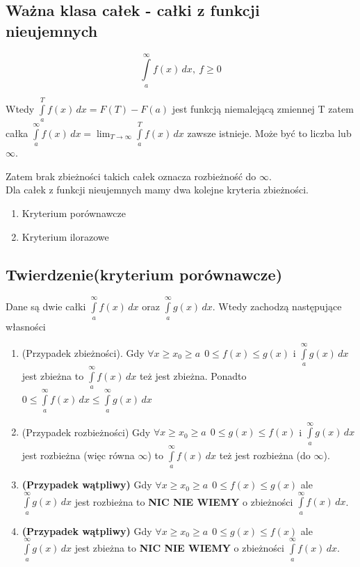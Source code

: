 \subsection*{Ważna klasa całek - całki z funkcji nieujemnych}

$$ \int\limits_{a}^{\infty} f(x) \,dx, \ f \geq 0 $$

Wtedy $ \int\limits_{a}^{T} f(x) \, dx = F(T) - F(a) $ jest funkcją niemalejącą zmiennej T zatem całka
$ \int\limits_{a}^{\infty} f(x) \, dx = \lim_{T \to \infty} \int\limits_{a}^{T} f(x) \,dx $
zawsze istnieje. Może być to liczba lub $\infty$.

Zatem brak zbieżności takich całek oznacza rozbieżność do $\infty$. \\

Dla całek z funkcji nieujemnych mamy dwa kolejne kryteria zbieżności.

\begin{enumerate}
    \item Kryterium porównawcze
    \item Kryterium ilorazowe
\end{enumerate}


\subsection{Twierdzenie(kryterium porównawcze)}

Dane są dwie całki $ \int\limits_{a}^{\infty} f(x) \,dx $ oraz
$ \int\limits_{a}^{\infty} g(x) \, dx $. Wtedy zachodzą następujące własności

\begin{enumerate}
    \item (Przypadek zbieżności). Gdy $ \forall x \geq x_0 \geq a \ \ 0 \leq f(x) \leq g(x) $ i $ \int\limits_{a}^{\infty} g(x) \,dx $
    jest zbieżna to $ \int\limits_{a}^{\infty} f(x) \,dx $ też jest zbieżna. Ponadto \
    $ 0 \leq \int\limits_{a}^{\infty} f(x) \,dx \leq \int\limits_{a}^{\infty} g(x) \,dx $
    
    \item (Przypadek rozbieżności) Gdy $ \forall x \geq x_0 \geq a \ \ 0 \leq g(x) \leq f(x) $ i $ \int\limits_{a}^{\infty} g(x) \,dx $
    jest rozbieżna (więc równa $\infty$) to $ \int\limits_{a}^{\infty} f(x) \,dx $ też jest rozbieżna (do $\infty$).
    
    \item \textbf{(Przypadek wątpliwy)} Gdy $ \forall x \geq x_0 \geq a \ \ 0 \leq f(x) \leq g(x) $ ale $ \int\limits_{a}^{\infty} g(x) \,dx $
    jest rozbieżna to \textbf{NIC NIE WIEMY} o zbieżności $ \int\limits_{a}^{\infty} f(x) \,dx $.
    
    \item \textbf{(Przypadek wątpliwy)} Gdy $ \forall x \geq x_0 \geq a \ \ 0 \leq g(x) \leq f(x) $ ale $ \int\limits_{a}^{\infty} g(x) \,dx $
    jest zbieżna to \textbf{NIC NIE WIEMY} o zbieżności $ \int\limits_{a}^{\infty} f(x) \,dx $.
\end{enumerate}

